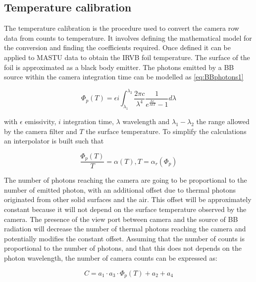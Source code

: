 \subsection{Temperature calibration}
The temperature calibration is the procedure used to convert the camera row data from counts to temperature. It involves defining the mathematical model for the conversion and finding the coefficients required. Once defined it can be applied to MASTU data to obtain the IRVB foil temperature.
The surface of the foil is approximated as a black body emitter. The photons emitted by a BB source within the camera integration time can be modelled as \autoref{eq:BBphotons1}


\begin{equation}
{\Phi}_p (T) = \epsilon i \int_{ {\lambda}_1 }^{ {\lambda}_2 } {\frac{2 \pi c } { {\lambda}^4 } \frac {1} { e^{\frac {hc} {\lambda k T}} -1} {d \lambda} }
\label{eq:BBphotons1}
\end{equation}

with $\epsilon$ emissivity, $i$ integration time, $\lambda$ wavelength and $\lambda_1-\lambda_2$ the range allowed by the camera filter and $T$ the surface temperature.
To simplify the calculations an interpolator is built such that

\begin{equation}
\frac {{\Phi}_p (T)} {T} = \alpha (T) , T = {\alpha}_r ({\Phi}_p)
\label{eq:BBphotons2}
\end{equation}

The number of photons reaching the camera are going to be proportional to the number of emitted photon, with an additional offset due to thermal photons originated from other solid surfaces and the air. This offset will be approximately constant because it will not depend on the surface temperature observed by the camera.
The presence of the view port between camera and the source of BB radiation will decrease the number of thermal photons reaching the camera and potentially modifies the constant offset.
Assuming that the number of counts is proportional to the number of photons, and that this does not depends on the photon wavelength, the number of camera counts can be expressed as:

\begin{equation}
C = a_1 \cdot a_3 \cdot {\Phi}_p (T) + a_2 + a_4
\label{eq:BBphotons3}
\end{equation}

